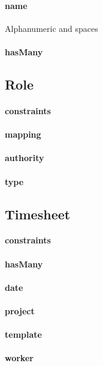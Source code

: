 \documentclass[12pt]{article}
\begin{document}
\paragraph{name} Alphanumeric and spaces 
\paragraph{hasMany}

\setcounter{paragraph}{0}
\subsection{Role}
\paragraph{constraints}
\paragraph{mapping}
\paragraph{authority}
\paragraph{type}

\setcounter{paragraph}{0}
\subsection{Timesheet}
\paragraph{constraints}
\paragraph{hasMany}
\paragraph{date}
\paragraph{project}
\paragraph{template}
\paragraph{worker}
\end{document}

